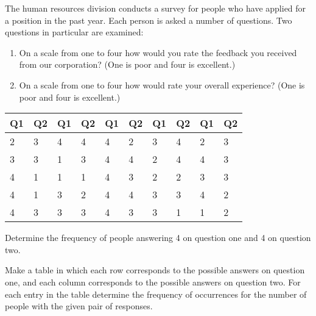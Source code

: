 \begin{problem}
\clearpage

\item The human resources division conducts a  survey for people who
  have applied for a position in the past year. Each person is asked a
  number of questions. Two questions in particular are examined:
  \begin{enumerate}
  \item On a scale from one to four how would you rate the feedback
    you received from our corporation? (One is poor and four is
    excellent.)
  \item On a scale from one to four how would rate your overall
    experience?  (One is poor and four is excellent.)
  \end{enumerate}

  \begin{tabular}{ll|ll|ll|ll|ll} %
    Q1 & Q2 & Q1 & Q2 & Q1 & Q2 & Q1 & Q2 & Q1 & Q2 \\ \hline
    2 & 3 & 4 & 4 & 4 & 2 & 3 & 4 & 2 & 3 \\
    3 & 3 & 1 & 3 & 4 & 4 & 2 & 4 & 4 & 3 \\
    4 & 1 & 1 & 1 & 4 & 3 & 2 & 2 & 3 & 3 \\
    4 & 1 & 3 & 2 & 4 & 4 & 3 & 3 & 4 & 2 \\
    4 & 3 & 3 & 3 & 4 & 3 & 3 & 1 & 1 & 2
  \end{tabular}

  \begin{subproblem}
  \item Determine the frequency of people answering 4 on question one
    and 4 on question two.
    \vspace{2em}
  \item Make a table in which each row corresponds to the possible
    answers on question one, and each column corresponds to the possible
    answers on question two. For each entry in the table determine the
    frequency of occurrences for the number of people with the given
    pair of responses.

    \vfill

  \end{subproblem}

  
\end{problem}



